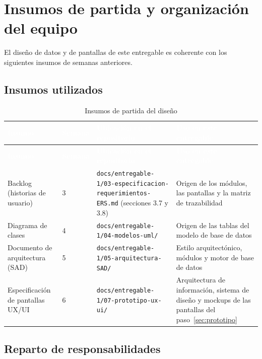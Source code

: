 \documentclass[11pt,a4paper]{article}
\newcommand{\cab}[1]{\textcolor{white}{\textbf{#1}}}
\begin{document}
\tableofcontents
\newpage

\section*{Insumos de partida y organización del equipo}

El diseño de datos y de pantallas de este entregable es coherente con los
siguientes insumos de semanas anteriores.

\subsection*{Insumos utilizados}

\begin{xltabular}{\linewidth}{|P{3.2cm}|P{1.5cm}|L|L|}
  \caption{Insumos de partida del diseño}\label{tab:insumos}\\
  \hline
  \cab{Insumo} & \cab{Semana} & \cab{Ubicación en el repositorio} & \cab{Uso en este entregable} \\ \hline
  \endfirsthead
  \hline
  \cab{Insumo} & \cab{Semana} & \cab{Ubicación en el repositorio} & \cab{Uso en este entregable} \\ \hline
  \endhead
  Backlog (historias de usuario) & 3 &
    \nolinkurl{docs/entregable-1/03-especificacion-requerimientos-ERS.md} (secciones 3.7 y 3.8) &
    Origen de los módulos, las pantallas y la matriz de trazabilidad \\ \hline
  Diagrama de clases & 4 &
    \nolinkurl{docs/entregable-1/04-modelos-uml/} &
    Origen de las tablas del modelo de base de datos \\ \hline
  Documento de arquitectura (SAD) & 5 &
    \nolinkurl{docs/entregable-1/05-arquitectura-SAD/} &
    Estilo arquitectónico, módulos y motor de base de datos \\ \hline
  Especificación de pantallas UX/UI & 6 &
    \nolinkurl{docs/entregable-1/07-prototipo-ux-ui/} &
    Arquitectura de información, sistema de diseño y mockups de las pantallas del
    paso~\ref{sec:prototipo} \\ \hline
\end{xltabular}

\subsection*{Reparto de responsabilidades}
\end{document}
